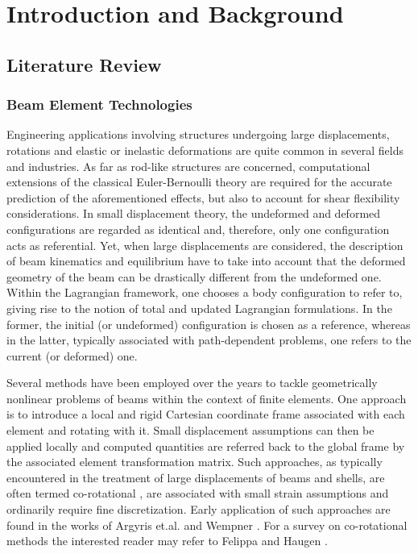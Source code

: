 \chapter{Introduction and Background}

\section{Literature Review}

\subsection{Beam Element Technologies}
Engineering applications involving structures undergoing large
displacements, rotations and elastic or inelastic deformations are quite
common in several fields and industries. As far as rod-like structures
are concerned, computational extensions of the classical Euler-Bernoulli theory
are required for the accurate prediction of the aforementioned effects, but
also to account for shear flexibility considerations.
In small displacement theory, the undeformed and deformed configurations are
regarded as identical and, therefore, only one configuration acts as
referential. Yet, when large displacements are considered, the
description of beam kinematics and equilibrium have to take into account that
the deformed geometry of the beam can be drastically different from the
undeformed one.  Within the Lagrangian framework, one chooses a body configuration
to refer to, giving rise to the notion of total and updated
Lagrangian formulations\cite{Bathe:1979}. In the former, the initial (or undeformed)
configuration is chosen as a reference, whereas in the latter, typically
associated with path-dependent problems, one refers to the current (or deformed)
one.

Several methods have been employed over the years to tackle geometrically
nonlinear problems of beams within the context of finite elements.  One approach
is to introduce a local and rigid Cartesian coordinate frame associated with
each element and rotating with it. Small displacement assumptions can then be
applied locally and computed quantities are referred back to the global
frame by the associated element transformation matrix. Such approaches, as
typically encountered in the treatment of large displacements of beams
and shells, are often termed co-rotational 
\cite{Belytschko:1973,Belytschko:1977,Rankin,Crisfield2},
are associated with small strain assumptions and ordinarily require fine
discretization. Early application of such approaches
are found in the works of Argyris et.al. \cite{Argyris} and Wempner 
\cite{Wempner:1969}. For
a survey on co-rotational methods the interested reader may refer to Felippa
and Haugen \cite{Felippa:2005}.

